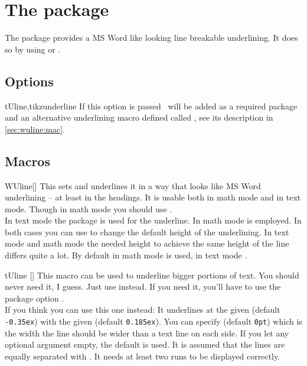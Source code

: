 \chapter{The  package}
The package provides a MS Word like looking line breakable underlining. It does
so by using  or .

\section{Options}\label{sec:wuline:options}%
\begin{describeopt}{tUline,tikzunderline}
  If this option is passed \TikZ\ will be added as a required package and an
  alternative underlining macro defined called , see its description
  in \autoref{sec:wuline:mac}.
\end{describeopt}

\section{Macros}\label{sec:wuline:mac}%
\begin{describemacro}{WUline}[]%
  This sets  and underlines it in a way that looks like MS Word
  underlining -- at least in the headings. It is usable both in math mode and in
  text mode. Though in math mode you should use .\\[\parskip]
  In text mode the  package is used for the underline. In math mode
   is employed. In both cases you can use  to
  change the default height of the underlining. In text mode and math mode the
  needed height to achieve the same height of the line differs quite a lot. By
  default in math mode \texttt{} is used, in
  text mode \texttt{}.
\end{describemacro}%
\begin{describemacro}{tUline}%
  []
  This macro can be used to underline bigger portions of text. You should never
  need it, I guess. Just use  instead. If you need it, you'll have to
  use the package option .\\[\parskip]
  If you think you can use this one instead: It underlines  at the
  given  (default \texttt{-0.35ex}) with the given 
  (default \texttt{0.185ex}). You can specify  (default
  \texttt{0pt}) which is the width the line should be wider than a text line on
  each side. If you let any optional argument empty, the default is used. It is
  assumed that the lines are equally separated with . It needs
  at least two runs to be displayed correctly.
\end{describemacro}%


